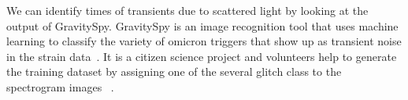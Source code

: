 \documentclass[12pt]{iopart}
\begin{document}


We can identify times of transients due to scattered light by looking at the output of GravitySpy.
GravitySpy is an image recognition tool that uses machine learning to classify the variety of omicron triggers that show up as transient noise in the strain data~\cite{omicron_florent,jess_thesis}. It is a citizen science project and volunteers help to generate the training dataset by assigning one of the several glitch class to the spectrogram images ~\cite{gspy,gspymachine}.
\end{document}
